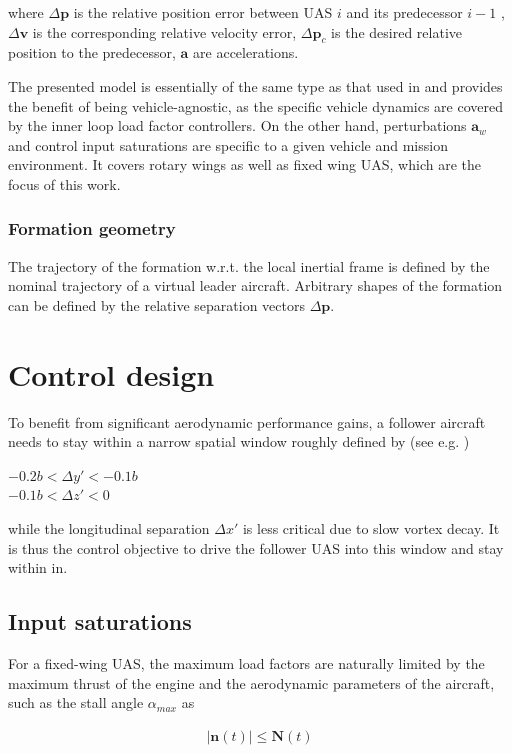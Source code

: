 \documentclass{ifacconf}
\providecommand{\mbf}[1]{\mathbf{#1}}
\newcommand{\idxFollower}{{\ensuremath{i} }}
\newcommand{\idxPredecessor}{{\ensuremath{i-1} }}
\begin{document}
where $\Delta \mbf{p}$ is the relative position error between UAS \idxFollower and its predecessor \idxPredecessor, $\Delta \mbf{v}$ is the corresponding relative velocity error, $\Delta \mbf{p}_c$ is the desired relative position to the predecessor, $\mbf{a}$ are accelerations.

The presented model is essentially of the same type as that used in  \cite{galzi2006uav} and provides the benefit of being vehicle-agnostic, as the specific vehicle dynamics are covered by the inner loop load factor controllers. On the other hand, perturbations $\mbf{a}_w$ and control input saturations are specific to a given vehicle and mission environment. It covers rotary wings as well as fixed wing UAS, which are the focus of this work.

\subsubsection{Formation geometry}
The trajectory of the formation w.r.t. the local inertial frame is defined by the nominal trajectory of a virtual leader aircraft. Arbitrary shapes of the formation can be defined by the relative separation vectors $\Delta \mbf{p}$. 

\section{Control design}
To benefit from significant aerodynamic performance gains, a follower aircraft needs to stay within a narrow spatial window roughly defined by (see e.g. \cite{jake2003f})

{\centering
$-0.2 b < \Delta y' < -0.1 b$ \\
$-0.1 b < \Delta z' < 0$ \\
}

while the longitudinal separation $\Delta x'$ is less critical due to slow vortex decay.
It is thus the control objective to drive the follower UAS into this window and stay within in.

\subsection{Input saturations}
For a fixed-wing UAS, the maximum load factors are naturally limited by the maximum thrust of the engine and the aerodynamic parameters of the aircraft, such as the stall angle $\alpha_{max}$ as

\begin{align}
|\mbf{n}(t)| \leq \mbf{N}(t)
\label{eq:loadfactorsaturations}
\end{align}
\end{document}
